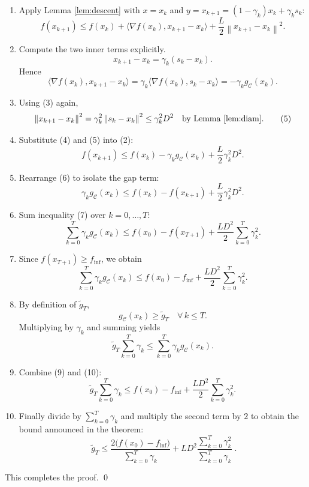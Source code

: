 \documentclass{article}
\newcommand{\norm}[1]{\left\lVert #1\right\rVert}
\newcommand{\ip}[2]{\langle #1,#2\rangle}
\begin{document}
\begin{enumerate}[label=[Step \arabic*], leftmargin=*, itemsep=4pt]
\item Apply Lemma \ref{lem:descent} with $x=x_k$ and $y=x_{k+1}=(1-\gamma_k)x_k+\gamma_k s_k$:
\[
f(x_{k+1}) \le f(x_k) + \ip{\nabla f(x_k)}{x_{k+1}-x_k}
                + \frac{L}{2}\norm{x_{k+1}-x_k}^2 . \tag{2}
\]

\item Compute the two inner terms explicitly.
\[
x_{k+1}-x_k = \gamma_k (s_k-x_k). \tag{3}
\]
Hence
\[
\ip{\nabla f(x_k)}{x_{k+1}-x_k}
     = \gamma_k \ip{\nabla f(x_k)}{s_k-x_k}
     = -\gamma_k g_{\mathcal C}(x_k) . \tag{4}
\]

\item Using (3) again,
\[
\norm{x_{k+1}-x_k}^2 = \gamma_k^2 \norm{s_k-x_k}^2
                    \le \gamma_k^2 D^2 \quad\text{by Lemma \ref{lem:diam}}. \tag{5}
\]

\item Substitute (4) and (5) into (2):
\[
f(x_{k+1}) \le f(x_k) - \gamma_k g_{\mathcal C}(x_k) 
                + \frac{L}{2}\gamma_k^2 D^2 . \tag{6}
\]

\item Rearrange (6) to isolate the gap term:
\[
\gamma_k g_{\mathcal C}(x_k) \le f(x_k)-f(x_{k+1}) 
                               + \frac{L}{2}\gamma_k^2 D^2 . \tag{7}
\]

\item Sum inequality (7) over $k=0,\dots,T$:
\[
\sum_{k=0}^{T}\gamma_k g_{\mathcal C}(x_k)
   \le f(x_0)-f(x_{T+1}) + \frac{L D^2}{2}\sum_{k=0}^{T}\gamma_k^2 . \tag{8}
\]

\item Since $f(x_{T+1})\ge f_{\inf}$, we obtain
\[
\sum_{k=0}^{T}\gamma_k g_{\mathcal C}(x_k)
   \le f(x_0)-f_{\inf} + \frac{L D^2}{2}\sum_{k=0}^{T}\gamma_k^2 . \tag{9}
\]

\item By definition of $\tilde g_T$,
\[
g_{\mathcal C}(x_k)\ge \tilde g_T\quad\forall\,k\le T .
\]
Multiplying by $\gamma_k$ and summing yields
\[
\tilde g_T \sum_{k=0}^{T}\gamma_k \le 
      \sum_{k=0}^{T}\gamma_k g_{\mathcal C}(x_k). \tag{10}
\]

\item Combine (9) and (10):
\[
\tilde g_T \sum_{k=0}^{T}\gamma_k 
   \le f(x_0)-f_{\inf} + \frac{L D^2}{2}\sum_{k=0}^{T}\gamma_k^2 . \tag{11}
\]

\item Finally divide by $\sum_{k=0}^{T}\gamma_k$ and multiply the second term by $2$ to obtain the bound announced in the theorem:
\[
\boxed{\;
\tilde g_T \le 
\frac{2\bigl(f(x_0)-f_{\inf}\bigr)}{\sum_{k=0}^{T}\gamma_k}
      + L D^2 \frac{\sum_{k=0}^{T}\gamma_k^2}{\sum_{k=0}^{T}\gamma_k}
\;} . \tag{12}
\]
\end{enumerate}
This completes the proof. \qed
\end{document}
